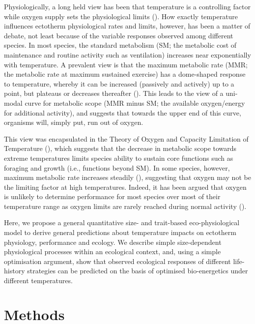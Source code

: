 \documentclass[a4paper, toc=index,abstract=true]{scrartcl}\usepackage[]{graphicx}\usepackage[]{color}
\begin{document}
\begin{spacing}{1.9}
Physiologically, a long held view has been that temperature is a controlling factor while oxygen supply sets the physiological limits (\cite{fry_effects_1947,claireaux_linking_2007,lefevre_are_2016}). How exactly temperature influences ectotherm physiological rates and limits, however, has been a matter of debate, not least because of the variable responses observed among different species. In most species, the standard metabolism (SM; the metabolic cost of maintenance and routine activity such as ventilation) increases near exponentially with temperature. A prevalent view is that the maximum metabolic rate (MMR; the metabolic rate at maximum sustained exercise) has a dome-shaped response to temperature, whereby it can be increased (passively and actively) up to a point, but plateaus or decreases thereafter (\cite{fry_effects_1947,claireaux_linking_2007,lefevre_are_2016,portner_physiology_2008}). This leads to the view of a uni-modal curve for metabolic scope (MMR minus SM; the available oxygen/energy for additional activity), and suggests that towards the upper end of this curve, organisms will, simply put, run out of oxygen. 

This view was encapsulated in the Theory of Oxygen and Capacity Limitation of Temperature (\cite{portner_oxygen-and_2010}), which suggests that the decrease in metabolic scope towards extreme temperatures limits species ability to sustain core functions such as foraging and growth (i.e., functions beyond SM). In some species, however, maximum metabolic rate increases steadily (\cite{lefevre_are_2016, verberk_does_2016}), suggesting that oxygen may not be the limiting factor at high temperatures. Indeed, it has been argued that oxygen is unlikely to determine performance for most species over most of their temperature range as oxygen limits are rarely reached during normal activity (\cite{jutfelt_oxygen-and_2018, holt_climate_2015}). 

Here, we propose a general quantitative size- and trait-based eco-physiological model to derive general predictions about temperature impacts on ectotherm physiology, performance and ecology. We describe simple size-dependent physiological processes within an ecological context, and, using a simple optimisation argument, show that observed ecological responses of different life-history strategies can be predicted on the basis of optimised bio-energetics under different temperatures.

\section{Methods}


\end{spacing}
\end{document}
